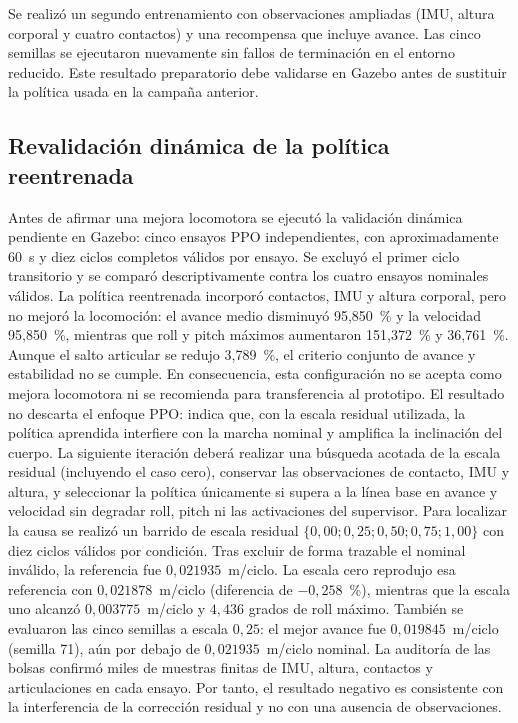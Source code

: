 Se realizó un segundo entrenamiento con observaciones ampliadas (IMU, altura
corporal y cuatro contactos) y una recompensa que incluye avance. Las cinco
semillas se ejecutaron nuevamente sin fallos de terminación en el entorno
reducido. Este resultado preparatorio debe validarse en Gazebo antes de
sustituir la política usada en la campaña anterior.

\subsection{Revalidación dinámica de la política reentrenada}

Antes de afirmar una mejora locomotora se ejecutó la validación dinámica
pendiente en Gazebo: cinco ensayos PPO independientes, con aproximadamente
60~s y diez ciclos completos válidos por ensayo. Se excluyó el primer ciclo
transitorio y se comparó descriptivamente contra los cuatro ensayos nominales válidos. La
política reentrenada incorporó contactos, IMU y altura corporal, pero no mejoró
la locomoción: el avance medio disminuyó 95,850~\% y la velocidad 95,850~\%,
mientras que roll y pitch máximos aumentaron 151,372~\% y 36,761~\%. Aunque el salto
articular se redujo 3,789~\%, el criterio conjunto de avance y estabilidad no se
cumple. En consecuencia, esta configuración no se acepta como mejora
locomotora ni se recomienda para transferencia al prototipo. El resultado no
descarta el enfoque PPO: indica que, con la escala residual utilizada, la
política aprendida interfiere con la marcha nominal y amplifica la inclinación
del cuerpo. La siguiente iteración deberá realizar una búsqueda acotada de la
escala residual (incluyendo el caso cero), conservar las observaciones de
contacto, IMU y altura, y seleccionar la política únicamente si supera a la
línea base en avance y velocidad sin degradar roll, pitch ni las activaciones
del supervisor. Para localizar la causa se realizó un barrido de escala
residual $\{0{,}00;0{,}25;0{,}50;0{,}75;1{,}00\}$ con diez ciclos válidos por
condición. Tras excluir de forma trazable el nominal inválido, la referencia
fue $0{,}021935$~m/ciclo. La escala cero reprodujo esa referencia con
$0{,}021878$~m/ciclo (diferencia de $-0{,}258$~\%), mientras que la escala uno alcanzó
$0{,}003775$~m/ciclo y $4{,}436$ grados de roll máximo. También se evaluaron
las cinco semillas a escala $0{,}25$: el mejor avance fue $0{,}019845$~m/ciclo
(semilla 71), aún por debajo de $0{,}021935$~m/ciclo nominal. La auditoría de
las bolsas confirmó miles de muestras finitas de IMU, altura, contactos y
articulaciones en cada ensayo. Por tanto, el resultado negativo es consistente
con la interferencia de la corrección residual y no con una ausencia de
observaciones.

